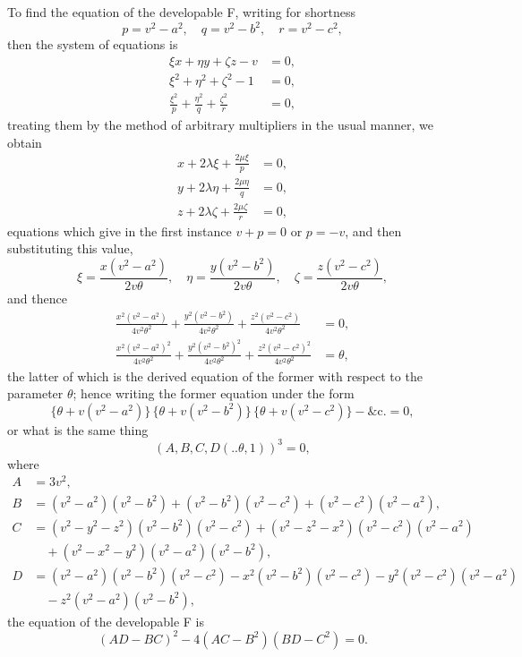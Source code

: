 \documentclass[12pt,a4paper]{article}
\newcommand{\qform}[2]{(#1 \mathbin{..} #2)}
\theoremstyle{definition}
\begin{document}
To find the equation of the developable F, writing for shortness
\[
p = v^{2} - a^{2},\quad q = v^{2} - b^{2},\quad r = v^{2} - c^{2},
\]
then the system of equations is
\begin{align*}
\xi x + \eta y + \zeta z - v &= 0,\\
\xi^{2} + \eta^{2} + \zeta^{2} - 1 &= 0,\\
\frac{\xi^{2}}{p} + \frac{\eta^{2}}{q} + \frac{\zeta^{2}}{r} &= 0,
\end{align*}
treating them by the method of arbitrary multipliers in the usual manner, we obtain
\begin{align*}
x + 2\lambda\xi + \frac{2\mu\xi}{p} &= 0,\\
y + 2\lambda\eta + \frac{2\mu\eta}{q} &= 0,\\
z + 2\lambda\zeta + \frac{2\mu\zeta}{r} &= 0,
\end{align*}
equations which give in the first instance $v + p = 0$ or $p = -v$, and then substituting
this value,
\[
\xi = \frac{x(v^{2} - a^{2})}{2v\theta},\quad
\eta = \frac{y(v^{2} - b^{2})}{2v\theta},\quad
\zeta = \frac{z(v^{2} - c^{2})}{2v\theta},
\]
and thence
\begin{align*}
\frac{x^{2}(v^{2} - a^{2})}{4v^{2}\theta^{2}} + \frac{y^{2}(v^{2} - b^{2})}{4v^{2}\theta^{2}}
+ \frac{z^{2}(v^{2} - c^{2})}{4v^{2}\theta^{2}} &= 0,\\
\frac{x^{2}(v^{2} - a^{2})^{2}}{4v^{2}\theta^{2}} + \frac{y^{2}(v^{2} - b^{2})^{2}}{4v^{2}\theta^{2}}
+ \frac{z^{2}(v^{2} - c^{2})^{2}}{4v^{2}\theta^{2}} &= \theta,
\end{align*}
the latter of which is the derived equation of the former with respect to the parameter
$\theta$; hence writing the former equation under the form
\[
\{\theta + v(v^{2} - a^{2})\}\,\{\theta + v(v^{2} - b^{2})\}\,\{\theta + v(v^{2} - c^{2})\}
- \&\mathrm{c}. = 0,
\]
or what is the same thing
\[
(A, B, C, D\!\qform{}{\theta, 1})^{3} = 0,
\]
where
\begin{align*}
A &= 3v^{2},\\
B &= (v^{2} - a^{2})(v^{2} - b^{2}) + (v^{2} - b^{2})(v^{2} - c^{2}) + (v^{2} - c^{2})(v^{2} - a^{2}),\\
C &= (v^{2} - y^{2} - z^{2})(v^{2} - b^{2})(v^{2} - c^{2}) + (v^{2} - z^{2} - x^{2})(v^{2} - c^{2})(v^{2} - a^{2})\\
&\quad + (v^{2} - x^{2} - y^{2})(v^{2} - a^{2})(v^{2} - b^{2}),\\
D &= (v^{2} - a^{2})(v^{2} - b^{2})(v^{2} - c^{2}) - x^{2}(v^{2} - b^{2})(v^{2} - c^{2})
- y^{2}(v^{2} - c^{2})(v^{2} - a^{2})\\
&\quad - z^{2}(v^{2} - a^{2})(v^{2} - b^{2}),
\end{align*}
the equation of the developable F is
\[
(AD - BC)^{2} - 4(AC - B^{2})(BD - C^{2}) = 0.
\]
\end{document}
